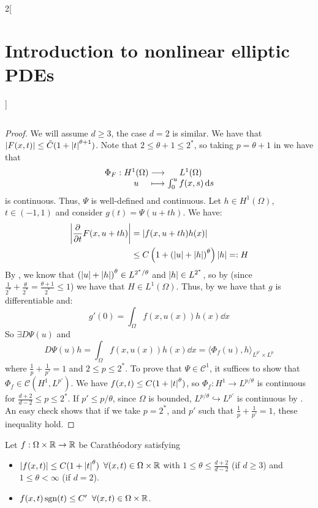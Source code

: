 \documentclass[../../../main_math.tex]{subfiles}
\begin{document}
\begin{multicols}{2}[\section{Introduction to nonlinear elliptic PDEs}]
\begin{proposition}
$$    $$
  \end{proposition}
  \begin{proof}
    We will assume $d\geq 3$, the case $d=2$ is similar. We have that $\abs{F(x,t)}\leq \tilde{C}(1+\abs{t}^{\theta+1})$. Note that $2\leq \theta+1\leq 2^*$, so taking $p=\theta+1$ in  we have that
    $$
      \function{\Phi_F}{H^1(\Omega)}{L^{1}(\Omega)}{u}{\int_0^{u}f(x,s)\dd{s}}
    $$
    is continuous. Thus, $\Psi$ is well-defined and continuous. Let $h\in H^1(\Omega)$, $t\in (-1,1)$ and consider $g(t)=\Psi(u+th)$. We have:
    \begin{align*}
      \abs{\pdv{}{t}F(x,u+th)} & =\abs{f(x,u+th)h(x)}                                      \\
                               & \leq C\left(1+{(\abs{u}+\abs{h})}^\theta\right)\abs{h}=:H
    \end{align*}
    By , we know that ${(\abs{u}+\abs{h})}^\theta\in L^{2^*/\theta}$ and $\abs{h}\in L^{2^*}$, so by  (since $\frac{1}{2^*}+\frac{\theta}{2^*}=\frac{\theta+1}{2^*}\leq 1$) we have that $H\in L^1(\Omega)$. Thus, by  we have that $g$ is differentiable and:
    $$
      g'(0)=\int_\Omega f(x,u(x))h(x)\dd{x}
    $$
    So $\exists D\Psi(u)$ and $$
      D\Psi(u)h=\int_\Omega f(x,u(x))h(x)\dd{x}={\langle \Phi_f(u), h\rangle}_{L^{p'}\times L^p}
    $$
    where $\frac{1}{p}+\frac{1}{p'}=1$ and $2\leq p\leq 2^*$. To prove that $\Psi\in\mathcal{C}^1$, it suffices to show that $\Phi_f\in \mathcal{C}(H^1,L^{p'})$. We have $f(x,t)\leq C(1+\abs{t}^\theta)$, so $\Phi_f:H^1\to L^{p/\theta}$ is continuous for $\frac{d+2}{d-2}\leq p\leq 2^*$. If $p'\leq p/\theta$, since $\Omega$ is bounded, $L^{p/\theta}\hookrightarrow L^{p'}$ is continuous by . An easy check shows that if we take $p=2^*$, and $p'$ such that $\frac{1}{p}+\frac{1}{p'}=1$, these inequality hold.
  \end{proof}
  \begin{theorem}
    Let $f:\Omega\times \mathbb{R}\to\mathbb{R}$ be Carathéodory satisfying
    \begin{itemize}
      \item $\abs{f(x,t)}\leq C(1+\abs{t}^\theta)$ $\forall (x,t)\in \Omega\times \mathbb{R}$ with $1\leq \theta\leq \frac{d+2}{d-2}$ (if $d\geq 3$) and $1\leq \theta<\infty$ (if $d=2$).
      \item $f(x,t)\operatorname{sgn}(t)\leq C'$ $\forall (x,t)\in \Omega\times \mathbb{R}$.
    \end{itemize}

\end{theorem}
\end{multicols}
\end{document}
